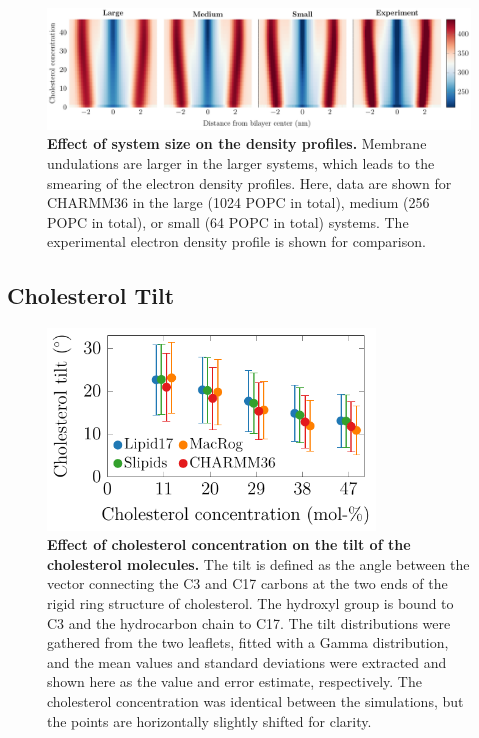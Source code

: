 \documentclass[journal=jpcbfk]{achemso}
\begin{document}
\begin{figure}[htb!]
    \centering
    \includegraphics[width=\linewidth]{../FIGS/densityprofiles_size.pdf}
    \caption{\label{SIfig:densprofssize}%
    \textbf{Effect of system size on the density profiles.}
    Membrane undulations are larger in the larger systems, which leads to the smearing of the electron density profiles. Here, data are shown for CHARMM36 in the large (1024 POPC in total), medium (256 POPC in total), or small (64 POPC in total) systems. The experimental electron density profile is shown for comparison.
    }
\end{figure}

\clearpage
\subsection{Cholesterol Tilt}

\begin{figure}[htb!]
    \centering
    \includegraphics[width=8.7cm]{../FIGS/choltilt.pdf}
    \caption{\label{SIfig:choltilt}%
     \textbf{Effect of cholesterol concentration on the tilt of the cholesterol molecules.}
     The tilt is defined as the angle between the vector connecting the C3 and C17 carbons at the two ends of the rigid ring structure of cholesterol. The hydroxyl group is bound to C3 and the hydrocarbon chain to C17. The tilt distributions were gathered from the two leaflets, fitted with a Gamma distribution, and the mean values and standard deviations were extracted and shown here as the value and error estimate, respectively. The cholesterol concentration was identical between the simulations, but the points are horizontally slightly shifted for clarity.
    }
\end{figure}

\clearpage



\end{document}
